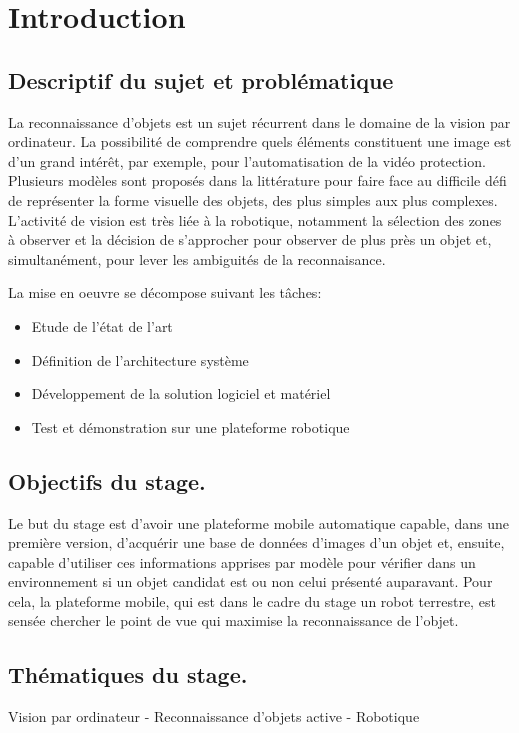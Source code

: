\chapter{Introduction}
\section{Descriptif du sujet et problématique}

La reconnaissance d'objets est un sujet récurrent dans le domaine de la vision par ordinateur. La possibilité de comprendre quels éléments constituent une image est d'un grand intérêt, par exemple, pour l'automatisation de la vidéo protection.  Plusieurs modèles sont proposés dans la littérature pour faire face au difficile défi de représenter la forme visuelle des objets, des plus simples aux plus complexes. L'activité de vision est très liée à la robotique, notamment la sélection des zones à observer et la décision de s'approcher pour observer de plus près un objet et, simultanément, pour lever les ambiguités de la reconnaisance.

La mise en oeuvre se décompose suivant les tâches: 
\begin{itemize}
\item Etude de l’état de l’art
\item Définition de l’architecture système 
\item Développement de la solution logiciel et matériel 
\item Test et démonstration sur une plateforme robotique
\end{itemize}

\section{Objectifs du stage.}
Le but du stage est d'avoir une plateforme mobile automatique capable, dans une première version, d'acquérir une base de données d'images d'un objet et, ensuite, capable d'utiliser ces informations apprises par modèle pour vérifier dans un environnement si un objet candidat est ou non celui présenté auparavant. Pour cela, la plateforme mobile, qui est dans le cadre du stage un robot terrestre, est sensée chercher le point de vue qui maximise la reconnaissance de l'objet.


\section{Thématiques du stage.}
Vision par ordinateur - Reconnaissance d'objets active - Robotique


